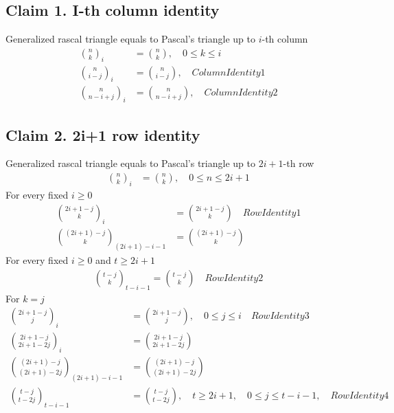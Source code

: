 \documentclass[12pt,letterpaper,oneside,reqno]{amsart}
\newcommand \rascalNumber [3] {\binom{#1}{#2}_{#3}}
\numberwithin{equation}{section}
\begin{document}
\subsection{Claim 1. I-th column identity} Generalized rascal triangle equals to Pascal's triangle up to $i$-th column
\begin{align}
    \rascalNumber{n}{k}{i}          &= \binom{n}{k}, \quad 0 \leq k \leq i \\
    \rascalNumber{n}{i-j}{i}        &= \binom{n}{i-j}, \quad ColumnIdentity1 \\
    \rascalNumber{n}{n-i+j}{i}      &= \binom{n}{n-i+j}, \quad ColumnIdentity2
\end{align}

\subsection{Claim 2. 2i+1 row identity} Generalized rascal triangle equals to Pascal's triangle up to $2i+1$-th row
\begin{align}
    \rascalNumber{n}{k}{i}                  &= \binom{n}{k}, \quad 0 \leq n \leq 2i+1
\end{align}
For every fixed $i \geq 0$
\begin{align}
    \rascalNumber{2i+1-j}{k}{i}             &= \binom{2i+1-j}{k} \quad RowIdentity1 \\
    \rascalNumber{(2i+1)-j}{k}{(2i+1)-i-1}  &= \binom{(2i+1)-j}{k}
\end{align}
For every fixed $i \geq 0$ and $t \geq 2i+1$
\begin{align}
    \rascalNumber{t-j}{k}{t-i-1}            = \binom{t-j}{k} \quad RowIdentity2
\end{align}
For $k=j$
\begin{align*}
    \rascalNumber{2i+1-j}{j}{i}         &= \binom{2i+1-j}{j}, \quad 0 \leq j \leq i \quad RowIdentity3 \\
    \rascalNumber{2i+1-j}{2i+1-2j}{i}   &= \binom{2i+1-j}{2i+1-2j} \\
    \rascalNumber{(2i+1)-j}{(2i+1)-2j}{(2i+1)-i-1}   &= \binom{(2i+1)-j}{(2i+1)-2j} \\
    \rascalNumber{t-j}{t-2j}{t-i-1}     &= \binom{t-j}{t-2j}, \quad t \geq 2i+1, \quad 0 \leq j \leq t-i-1, \quad RowIdentity4 \\
\end{align*}
\end{document}
